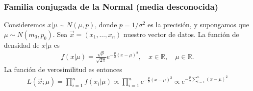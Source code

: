 \subsubsection{Familia conjugada de la Normal (media desconocida)}
\noindent Consideremos $x | \mu \sim N(\mu,p)$, donde $p = 1/\sigma^2$ es la precisión, y supongamos que $\mu \sim N(m_0,p_0)$. Sea $\vec{x} = (x_1,\ldots,x_n)$ nuestro vector de datos. La función de densidad de $x | \mu$ es
\begin{align*}
    f(x | \mu) = \frac{\sqrt{p}}{\sqrt{2\pi}}e^{-\frac{p}{2}(x-\mu)^2}, \quad x \in \mathbb{R}, \quad \mu \in \mathbb{R}.
\end{align*}
La función de verosimilitud es entonces
\begin{align*}
    L(\vec{x};\mu) = \prod_{i=1}^{n} f(x_i | \mu) \propto \prod_{i=1}^{n} e^{-\frac{p}{2}(x-\mu)^2} \propto e^{-\frac{p}{2}\sum_{i=1}^{n}(x-\mu)^2}
\end{align*}

